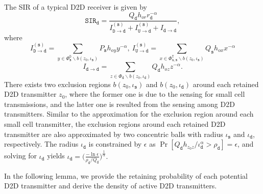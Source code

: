 \documentclass[twocolumn,english]{IEEEtran}
\theoremstyle{plain}
\theoremstyle{definition}
\begin{document}
The SIR of a typical D2D receiver is given by
\begin{equation}
\mathtt{SIR_{d}}=\frac{Q_{\mathtt{d}}h_{or}r_{\mathtt{d}}^{-\alpha}}{I_{\mathtt{D\rightarrow d}}^{\mathtt{(s)}}+I_{\mathtt{U\rightarrow d}}^{\mathtt{(s)}}+I_{\mathtt{d\rightarrow d}}},
\end{equation}
where
\[
I_{\mathtt{D\rightarrow d}}^{\mathtt{(s)}}=\sum_{y\in\Phi_{\mathtt{s}}^{\mathtt{D}}\backslash b\left(z_{0},\iota_{\mathtt{s}}\right)}P_{\mathtt{s}}h_{oy}y^{-\alpha},\: I_{\mathtt{U\rightarrow d}}^{\mathtt{(s)}}=\sum_{x\in\Phi_{\mathtt{u},\mathtt{s}}^{\mathtt{T}}\backslash b\left(z_{0},\iota_{\mathtt{s}}\right)}Q_{\mathtt{s}}h_{ox}x^{-\alpha}
\]
\[
I_{\mathtt{d\rightarrow d}}=\sum_{z\in\Phi_{\mathtt{d}}\backslash b\left(z_{0},\iota_{\mathit{\mathtt{d}}}\right)}Q_{\mathtt{d}}h_{oz}z^{-\alpha}.
\]
There exists two exclusion regions $b\left(z_{0},\iota_{\mathtt{s}}\right)$
and $b\left(z_{0},\iota_{\mathtt{d}}\right)$ around each retained
D2D transmitter $z_{0}$, where the former one is due to the sensing
for small cell transmissions, and the latter one is resulted from
the sensing among D2D transmitters. Similar to the approximation for
the exclusion region around each small cell transmitter, the exclusion
regions around each retained D2D transmitter are also approximated
by two concentric balls with radius $\iota_{\mathtt{s}}$ and $\iota_{\mathtt{d}}$,
respectively. The radius $\iota_{\mathit{\mathtt{d}}}$ is constrained
by $\epsilon$ as $\Pr[Q_{\mathtt{d}}h_{z_{0}z}/\iota_{\mathtt{d}}^{\alpha}>\rho_{\mathtt{d}}]=\epsilon$,
and solving for $\iota_{\mathit{\mathtt{d}}}$ yields $\iota_{\mathtt{d}}=\bigl(\frac{-\ln\epsilon}{\rho_{\mathtt{d}}/Q_{\mathtt{d}}}\bigr)^{\frac{1}{\alpha}}.$

In the following lemma, we provide the retaining probability of each
potential D2D transmitter and derive the density of active D2D transmitters.
\end{document}
